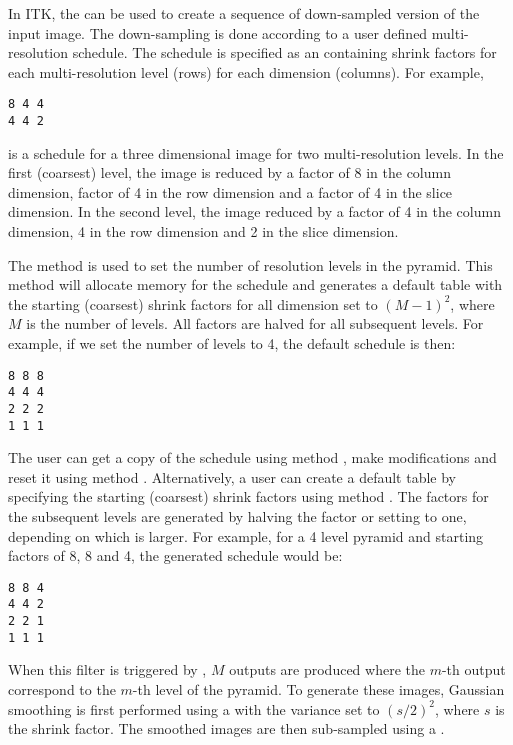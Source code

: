 

In ITK, the  can be used to create a
sequence of down-sampled version of the input image.  The down-sampling is done
according to a user defined multi-resolution schedule. The schedule is
specified as an  containing shrink factors for each
multi-resolution level (rows) for each dimension (columns). For example,

\begin{verbatim}
8 4 4
4 4 2
\end{verbatim}

is a schedule for a three dimensional image for two multi-resolution levels. 
In the first (coarsest) level, the image is reduced by a factor of 8 
in the column dimension, factor of 4 in the row dimension and a factor
of 4 in the slice dimension. In the second level, the image reduced
by a factor of 4 in the column dimension, 4 in the row dimension and
2 in the slice dimension.


The method  is used to set the number of
resolution levels in the pyramid. This method will allocate memory
for the schedule and generates a default table with the starting
(coarsest) shrink factors for all dimension set to $(M-1)^2$, 
where $M$ is the number of levels. All factors are halved for
all subsequent levels. For example, if we set the number of levels
to 4, the default schedule is then:

\begin{verbatim}
8 8 8
4 4 4
2 2 2
1 1 1
\end{verbatim}


The user can get a copy of the schedule using method ,
make modifications and reset it using method .
Alternatively, a user can create a default table by specifying the
starting (coarsest) shrink factors using method 
. The factors for the subsequent
levels are generated by halving the factor or setting to one, 
depending on which is larger. For example, for a 4 level pyramid
and starting factors of 8, 8 and 4, the generated schedule would be:

\begin{verbatim}
8 8 4
4 4 2
2 2 1
1 1 1
\end{verbatim}

When this filter is triggered by , $M$ outputs are produced
where the $m$-th output correspond to the $m$-th level of the pyramid.
To generate these images, Gaussian smoothing is first performed using a
 with the variance set to $(s/2)^2$,
where $s$ is the shrink factor. The smoothed images are then sub-sampled using
a .
